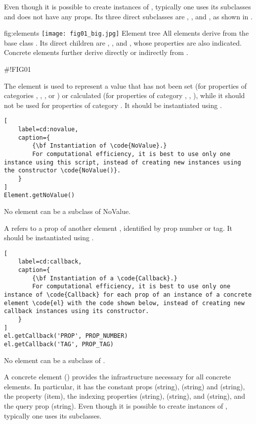 \documentclass{tufte-handout}
\begin{document}
Even though it is possible to create instances of , typically one uses its subclasses and does not have any props.
Its three direct subclasses are , , and , as shown in .

	{fig:elements}
	{\texttt{[image: fig01\_big.jpg]}}
	{Element tree}
	{
	All elements derive from the base class . 
	Its direct children are , , and , whose properties are also indicated.
	Concrete elements further derive directly or indirectly from .
	}

#!FIG01

The element  is used to represent a value that has not been set (for properties of categories , , ,  or ) or calculated (for properties of category , , ), while it should not be used for properties of category .
It should be instantiated using .
%
\begin{lstlisting}[
	label=cd:novalue,
	caption={
		{\bf Instantiation of \code{NoValue}.}
		For computational efficiency, it is best to use only one instance using this script, instead of creating new instances using the constructor \code{NoValue()}. 
	}
]
Element.getNoValue()
\end{lstlisting}
%
No element can be a subclass of NoValue.
  
A  refers to a prop of another element , identified by prop number or tag.
It should be instantiated using .
%
\begin{lstlisting}[
	label=cd:callback,
	caption={
		{\bf Instantiation of a \code{Callback}.}
		For computational efficiency, it is best to use only one instance of \code{Callback} for each prop of an instance of a concrete element \code{el} with the code shown below, instead of creating new callback instances using its constructor. 
	}
]
el.getCallback('PROP', PROP_NUMBER)
el.getCallback('TAG', PROP_TAG)
\end{lstlisting}
%
No element can be a subclass of .

A concrete element () provides the infrastructure necessary for all concrete elements. 
In particular, it has the constant props  (string),  (string) and  (string), the property  (item), the indexing properties  (string),  (string), and  (string), and the query prop  (string).
Even though it is possible to create instances of , typically one uses its subclasses.
\end{document}
